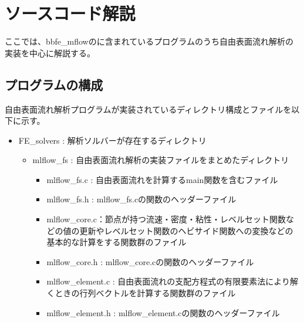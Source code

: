 \newpage
\section{ソースコード解説}
ここでは、bbfe\_mflowのに含まれているプログラムのうち自由表面流れ解析の実装を中心に解説する。

\subsection{プログラムの構成}
自由表面流れ解析プログラムが実装されているディレクトリ構成とファイルを以下に示す。

\begin{itemize}
	\item FE\_solvers : 解析ソルバーが存在するディレクトリ
  \begin{itemize}
    \item mlflow\_fs : 自由表面流れ解析の実装ファイルをまとめたディレクトリ
    \begin{itemize}
    	\item mlflow\_fs.c : 自由表面流れを計算するmain関数を含むファイル
    	\item mlflow\_fs.h : mlflow\_fs.cの関数のヘッダーファイル
    	\item mlflow\_core.c：節点が持つ流速・密度・粘性・レベルセット関数などの値の更新やレベルセット関数のヘビサイド関数への変換などの基本的な計算をする関数群のファイル
    	\item mlflow\_core.h : mlflow\_core.cの関数のヘッダーファイル
    	\item mlflow\_element.c : 自由表面流れの支配方程式の有限要素法により解くときの行列ベクトルを計算する関数群のファイル
    	\item mlflow\_element.h : mlflow\_element.cの関数のヘッダーファイル
    \end{itemize}
  \end{itemize}
\end{itemize}

